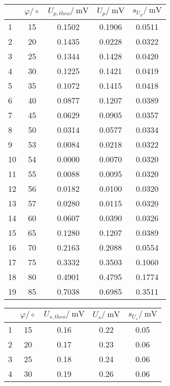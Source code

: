 \begin{center}
    \begin{tabular}{l | c c c c}
        {} & $\varphi/\circ$ & $U_{p,theo}/~\text{mV}$ & $U_{p}/~\text{mV}$ & $s_{U_{p}}/~\text{mV}$\\
        \hline
        1  & 15 & 0.1502 & 0.1906 & 0.0511 \\
        2  & 20 & 0.1435 & 0.0228 & 0.0322 \\
        3  & 25 & 0.1344 & 0.1428 & 0.0420 \\
        4  & 30 & 0.1225 & 0.1421 & 0.0419 \\
        5  & 35 & 0.1072 & 0.1415 & 0.0418 \\
        6  & 40 & 0.0877 & 0.1207 & 0.0389 \\
        7  & 45 & 0.0629 & 0.0905 & 0.0357 \\
        8  & 50 & 0.0314 & 0.0577 & 0.0334 \\
        9  & 53 & 0.0084 & 0.0218 & 0.0322 \\
        10 & 54 & 0.0000 & 0.0070 & 0.0320 \\
        11 & 55 & 0.0088 & 0.0095 & 0.0320 \\
        12 & 56 & 0.0182 & 0.0100 & 0.0320 \\
        13 & 57 & 0.0280 & 0.0115 & 0.0320 \\
        14 & 60 & 0.0607 & 0.0390 & 0.0326 \\
        15 & 65 & 0.1280 & 0.1207 & 0.0389 \\
        16 & 70 & 0.2163 & 0.2088 & 0.0554 \\
        17 & 75 & 0.3332 & 0.3503 & 0.1060 \\
        18 & 80 & 0.4901 & 0.4795 & 0.1774 \\
        19 & 85 & 0.7038 & 0.6985 & 0.3511 \\
    \end{tabular}
    \begin{tabular}{l | c c c c}
        {} & $\varphi/\circ$ & $U_{s,theo}/~\text{mV}$ & $U_{s}/~\text{mV}$ & $s_{U_{s}}/~\text{mV}$\\
        \hline
        1  & 15 & 0.16 & 0.22 & 0.05 \\
        2  & 20 & 0.17 & 0.23 & 0.06 \\
        3  & 25 & 0.18 & 0.24 & 0.06 \\
        4  & 30 & 0.19 & 0.26 & 0.06 \\

\end{tabular}
\end{center}
